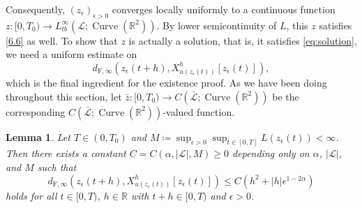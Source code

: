 \documentclass[reqno,centertags,12pt]{amsart}
\newtheorem{lemma}[theorem]{Lemma}
\theoremstyle{definition}
\numberwithin{equation}{section}
\newcommand{\abs}[1]{\left\lvert#1\right\rvert}
\newcommand{\seq}[1]{\left( #1 \right)}
\newcommand{\bbR}{{\mathbb{R}}}
\begin{document}
Consequently, $\seq{z_{\epsilon}}_{\epsilon>0}$ converges locally uniformly to
a continuous function
$z\colon[0,T_{0})\to L_{tb}^{\infty}(\mathcal{L};\operatorname{Curve}(\bbR^{2}))$.
By lower semicontinuity of $L$, this $z$ satisfies
\eqref{6.6} as well. To show that $z$ is actually a solution,
that is, it satisfies \eqref{eq:solution}, we need a uniform estimate on
\[
    d_{\mathrm{F},\infty}\left(z_{\epsilon}(t+h),
    X_{u(z_{\epsilon}(t))}^{h}[z_{\epsilon}(t)]\right),
\]
which is the final ingredient for the existence proof.
As we have been doing throughout this section, let
$\bar{z}\colon [0,T_{0})\to C(\bar{\mathcal{L}};\operatorname{Curve}(\bbR^{2}))$
be the corresponding $C(\bar{\mathcal{L}};\operatorname{Curve}(\bbR^{2}))$-valued function.

\begin{lemma}\label{L6.17}
    Let $T\in(0,T_{0})$ and
    $M\coloneqq\sup_{\epsilon>0}\sup_{t\in[0,T]}L(z_{\epsilon}(t)) < \infty$.
    Then there exists a constant $C = C(\alpha,\abs{\mathcal{L}},M)\geq 0$
    depending only on $\alpha$, $\abs{\mathcal{L}}$, and $M$ such that
    \[
        d_{\mathrm{F},\infty}\left(
            z_{\epsilon}(t+h),
            X_{u(z_{\epsilon}(t))}^{h}[z_{\epsilon}(t)]
        \right)
        \leq C(h^{2} + \abs{h}\epsilon^{1-2\alpha})
    \]
    holds for all $t\in[0,T)$, $h\in\bbR$ with $t+h\in[0,T)$ and $\epsilon>0$.
\end{lemma}
\end{document}
